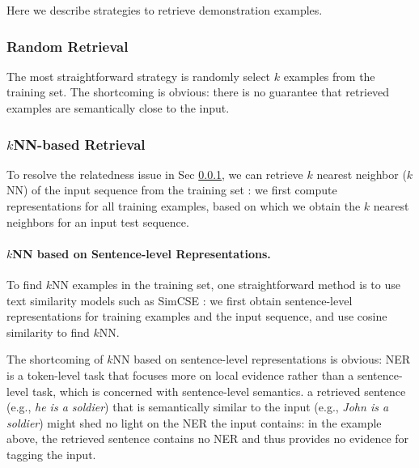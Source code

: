\documentclass[11pt]{article}
\begin{document}
Here we describe strategies to retrieve demonstration examples. 
\subsubsection{Random Retrieval}
\label{random_retrieval}
The most straightforward strategy is randomly select $k$ examples from the training set. 
The shortcoming is obvious: there is no guarantee that retrieved examples are semantically close to the input. 

\subsubsection{$k$NN-based Retrieval}
To resolve the relatedness issue in Sec \ref{random_retrieval}, 
we can retrieve  
 $k$ nearest neighbor ($k$NN) of the input sequence from the training set \cite{vilar2022prompting, liu2021makes}:
 we first compute 
 representations for all training examples, based on which we obtain the  $k$ nearest neighbors for an input test sequence. 
 
 


\paragraph{$k$NN based on Sentence-level Representations.}
To find $k$NN examples in the training set, one straightforward method is to  use text similarity models such as SimCSE \cite{gao2021simcse}:
we first obtain sentence-level representations for training examples and the input sequence, and use cosine similarity to find $k$NN.

The shortcoming of $k$NN based on sentence-level representations is obvious:
NER is a token-level task that focuses more on local evidence rather than a sentence-level task, which is concerned with sentence-level semantics.
 a retrieved sentence (e.g., {\it he is a soldier}) that is semantically similar to the input (e.g., {\it John is a soldier})  might shed no light on the NER the input contains:
 in the example above, the retrieved sentence contains no NER and thus provides no evidence for tagging the input.  
\end{document}
